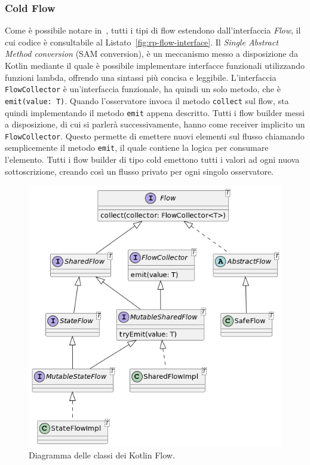 \documentclass[12pt,a4paper,openright,twoside]{book}
\begin{document}
\subsubsection{Cold Flow}
\label{sec:cold-flow}
Come è possibile notare in~, tutti i tipi di flow estendono dall'interfaccia \textit{Flow}, il cui codice è consultabile al Listato~\ref{fig:rp-flow-interface}.
Il \textit{Single Abstract Method conversion} (SAM conversion), è un meccanismo messo a disposizione da Kotlin mediante il quale è possibile implementare interfacce funzionali utilizzando funzioni lambda, offrendo una sintassi più concisa e leggibile.  
L'interfaccia \texttt{FlowCollector} è un'interfaccia funzionale, ha quindi un solo metodo, che è \texttt{emit(value: T)}. 
Quando l'osservatore invoca il metodo \texttt{collect} sul flow, sta quindi implementando il metodo \texttt{emit} appena descritto. 
Tutti i flow builder messi a disposizione, di cui si parlerà successivamente, hanno come receiver implicito un \texttt{FlowCollector}. Questo permette di emettere nuovi elementi sul flusso chiamando semplicemente il metodo \texttt{emit}, il quale contiene la logica per consumare l'elemento.
Tutti i flow builder di tipo cold emettono tutti i valori ad ogni nuova sottoscrizione, creando così un flusso privato per ogni singolo osservatore.  



\begin{figure}
    \centering
    \includegraphics[width=.80\linewidth]{figures/reactive-programming/flow-class-diagram.png}
    \caption{Diagramma delle classi dei Kotlin Flow.}
    \label{fig:rp-flow-class-diagram}
\end{figure}
\end{document}
